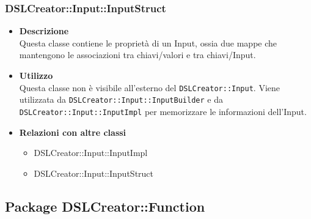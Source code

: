  \subsubsection{DSLCreator::Input::InputStruct}
                    \begin{itemize}
                        \item \textbf{Descrizione} \hfill \\
                          Questa classe contiene le proprietà di un Input, ossia due mappe che mantengono le associazioni tra chiavi/valori e tra chiavi/Input.
                        \item \textbf{Utilizzo} \hfill \\
                          Questa classe non è visibile all'esterno del  \texttt{DSLCreator::Input}. Viene utilizzata da \texttt{DSLCreator::Input::InputBuilder} e da \texttt{DSLCreator::Input::InputImpl} per memorizzare le informazioni dell'Input.
                        \item \textbf{Relazioni con altre classi}
                            \begin{itemize}
                              \item DSLCreator::Input::InputImpl
                              \item DSLCreator::Input::InputStruct
                            \end{itemize}
                    \end{itemize}  

\subsection{Package DSLCreator::Function}
